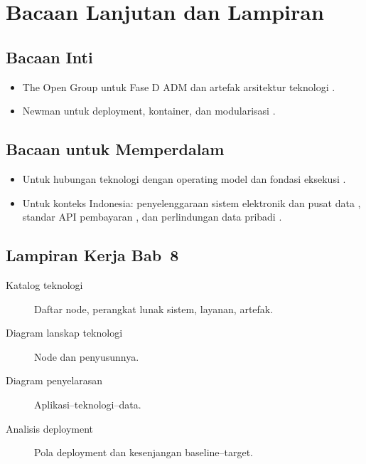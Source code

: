 \section{Bacaan Lanjutan dan Lampiran}

\subsection*{Bacaan Inti}
\begin{itemize}
  \item The Open Group untuk Fase D ADM dan artefak arsitektur teknologi
        \cite{togaf10}.
  \item Newman untuk deployment, kontainer, dan modularisasi
        \cite{newman2021building}.
\end{itemize}

\subsection*{Bacaan untuk Memperdalam}
\begin{itemize}
  \item Untuk hubungan teknologi dengan operating model dan fondasi eksekusi
        \cite{ross2006enterprise}.
  \item Untuk konteks Indonesia: penyelenggaraan sistem elektronik dan pusat data
        \cite{pp712019}, standar API pembayaran \cite{snapbi}, dan perlindungan
        data pribadi \cite{uupdp2022}.
\end{itemize}

\subsection*{Lampiran Kerja Bab~8}
\begin{description}
  \item[Katalog teknologi] Daftar node, perangkat lunak sistem, layanan, artefak.
  \item[Diagram lanskap teknologi] Node dan penyusunnya.
  \item[Diagram penyelarasan] Aplikasi--teknologi--data.
  \item[Analisis deployment] Pola deployment dan kesenjangan baseline--target.
\end{description}
\setlength{\emergencystretch}{0pt}
